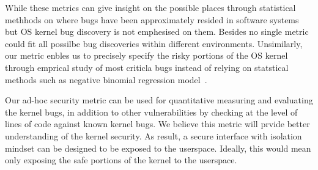 
While these metrics can give insight on the possible places through statistical methhods on where bugs have been approximately resided in software systems but OS kernel bug discovery is not emphesised on them. Besides no single metric could fit all possilbe bug discoveries within different environments. Unsimilarly, our metric enbles us to precisely specify the risky portions of the OS kernel through emprical study of most criticla bugs instead of relying on statstical methods such as negative binomial regression model~\cite{Bug-Location}.  




Our ad-hoc security metric can be used for quantitative measuring and evaluating the kernel bugs, in addition to other vulnerabilities by checking at the level of lines of code against known kernel bugs. We believe this metric will prvide better understanding of the kernel security. As result, a secure interface with isolation mindset can be designed to be exposed to the userspace. Ideally, this would mean only exposing the safe portions of the kernel to the userspace. 

